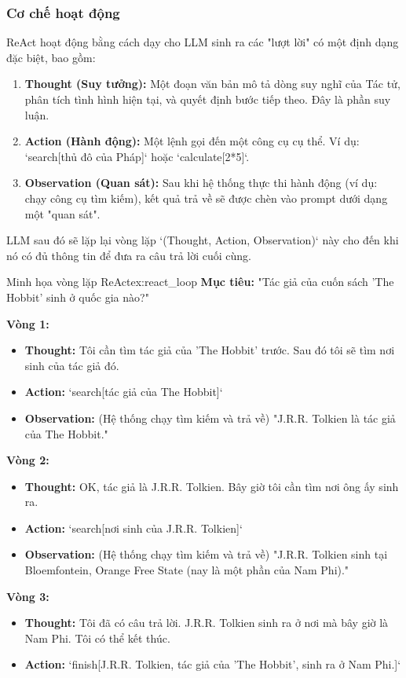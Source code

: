 \subsubsection{Cơ chế hoạt động}
ReAct hoạt động bằng cách dạy cho LLM sinh ra các "lượt lời" có một định dạng đặc biệt, bao gồm:
\begin{enumerate}
    \item \textbf{Thought (Suy tưởng):} Một đoạn văn bản mô tả dòng suy nghĩ của Tác tử, phân tích tình hình hiện tại, và quyết định bước tiếp theo. Đây là phần suy luận.
    \item \textbf{Action (Hành động):} Một lệnh gọi đến một công cụ cụ thể. Ví dụ: `search[thủ đô của Pháp]` hoặc `calculate[2*5]`.
    \item \textbf{Observation (Quan sát):} Sau khi hệ thống thực thi hành động (ví dụ: chạy công cụ tìm kiếm), kết quả trả về sẽ được chèn vào prompt dưới dạng một "quan sát".
\end{enumerate}

LLM sau đó sẽ lặp lại vòng lặp `(Thought, Action, Observation)` này cho đến khi nó có đủ thông tin để đưa ra câu trả lời cuối cùng.

\begin{example}{Minh họa vòng lặp ReAct}{ex:react_loop}
    \textbf{Mục tiêu:} "Tác giả của cuốn sách 'The Hobbit' sinh ở quốc gia nào?"
    
    \textbf{Vòng 1:}
    \begin{itemize}
        \item \textbf{Thought:} Tôi cần tìm tác giả của 'The Hobbit' trước. Sau đó tôi sẽ tìm nơi sinh của tác giả đó.
        \item \textbf{Action:} `search[tác giả của The Hobbit]`
        \item \textbf{Observation:} (Hệ thống chạy tìm kiếm và trả về) "J.R.R. Tolkien là tác giả của The Hobbit."
    \end{itemize}

    \textbf{Vòng 2:}
    \begin{itemize}
        \item \textbf{Thought:} OK, tác giả là J.R.R. Tolkien. Bây giờ tôi cần tìm nơi ông ấy sinh ra.
        \item \textbf{Action:} `search[nơi sinh của J.R.R. Tolkien]`
        \item \textbf{Observation:} (Hệ thống chạy tìm kiếm và trả về) "J.R.R. Tolkien sinh tại Bloemfontein, Orange Free State (nay là một phần của Nam Phi)."
    \end{itemize}
    
    \textbf{Vòng 3:}
    \begin{itemize}
        \item \textbf{Thought:} Tôi đã có câu trả lời. J.R.R. Tolkien sinh ra ở nơi mà bây giờ là Nam Phi. Tôi có thể kết thúc.
        \item \textbf{Action:} `finish[J.R.R. Tolkien, tác giả của 'The Hobbit', sinh ra ở Nam Phi.]`
    \end{itemize}
\end{example}

